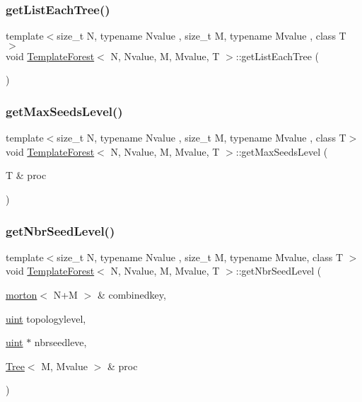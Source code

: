 \subsubsection{\texorpdfstring{get\+List\+Each\+Tree()}{getListEachTree()}}
{\footnotesize\ttfamily template$<$size\+\_\+t N, typename Nvalue , size\+\_\+t M, typename Mvalue , class T $>$ \\
void \mbox{\hyperlink{classTemplateForest}{Template\+Forest}}$<$ N, Nvalue, M, Mvalue, T $>$\+::get\+List\+Each\+Tree (\begin{DoxyParamCaption}{ }\end{DoxyParamCaption})}

\mbox{\label{classTemplateForest_a71631fc657f72080f48dee632e706f2d}} 
\subsubsection{\texorpdfstring{get\+Max\+Seeds\+Level()}{getMaxSeedsLevel()}}
{\footnotesize\ttfamily template$<$size\+\_\+t N, typename Nvalue , size\+\_\+t M, typename Mvalue , class T$>$ \\
void \mbox{\hyperlink{classTemplateForest}{Template\+Forest}}$<$ N, Nvalue, M, Mvalue, T $>$\+::get\+Max\+Seeds\+Level (\begin{DoxyParamCaption}\item[{T \&}]{proc }\end{DoxyParamCaption})}

\mbox{\label{classTemplateForest_a6ce3bbf28ceb4e78324aaf8706fedc92}} 
\subsubsection{\texorpdfstring{get\+Nbr\+Seed\+Level()}{getNbrSeedLevel()}\hspace{0.1cm}{\footnotesize\ttfamily [1/2]}}
{\footnotesize\ttfamily template$<$size\+\_\+t N, typename Nvalue , size\+\_\+t M, typename Mvalue, class T $>$ \\
void \mbox{\hyperlink{classTemplateForest}{Template\+Forest}}$<$ N, Nvalue, M, Mvalue, T $>$\+::get\+Nbr\+Seed\+Level (\begin{DoxyParamCaption}\item[{\mbox{\hyperlink{definitions_8h_af8682350bd8bb38ee9023f7a0a310add}{morton}}$<$ N+M $>$ \&}]{combinedkey,  }\item[{\mbox{\hyperlink{definitions_8h_a69aa29b598b851b0640aa225a9e5d61d}{uint}}}]{topologylevel,  }\item[{\mbox{\hyperlink{definitions_8h_a69aa29b598b851b0640aa225a9e5d61d}{uint}} $\ast$}]{nbrseedleve,  }\item[{\mbox{\hyperlink{classTree}{Tree}}$<$ M, Mvalue $>$ \&}]{proc }\end{DoxyParamCaption})}

